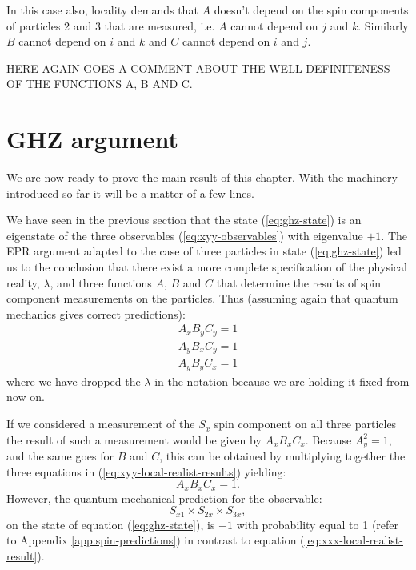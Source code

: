 In this case also, locality demands that $A$ doesn't depend on the spin components of particles 2 and 3 that are measured, i.e. $A$ cannot depend on $j$ and $k$. Similarly $B$ cannot depend on $i$ and $k$ and $C$ cannot depend on $i$ and $j$.

\begin{observation}
  HERE AGAIN GOES A COMMENT ABOUT THE WELL DEFINITENESS OF THE FUNCTIONS A, B AND C.
\end{observation}


\section{GHZ argument}
We are now ready to prove the main result of this chapter. With the machinery introduced so far it will be a matter of a few lines.

We have seen in the previous section that the state (\ref{eq:ghz-state}) is an eigenstate of the three observables (\ref{eq:xyy-observables}) with eigenvalue $+ 1$. The EPR argument adapted to the case of three particles in state (\ref{eq:ghz-state}) led us to the conclusion that there exist a more complete specification of the physical reality, $\lambda$, and three functions $A$, $B$ and $C$ that determine the results of spin component measurements on the particles. Thus (assuming again that quantum mechanics gives correct predictions):%
\begin{equation}
  \begin{split}
    A_x B_y C_y = 1\\
    A_y B_x C_y = 1\\
    A_y B_y C_x = 1
  \end{split}
  \label{eq:xyy-local-realist-results}
\end{equation}
where we have dropped the $\lambda$ in the notation because we are holding it fixed from now on.

If we considered a measurement of the $S_x$ spin component on all three particles the result of such a measurement would be given by $A_x B_x C_x$. Because $A_y^2 = 1$, and the same goes for $B$ and $C$, this can be obtained by multiplying together the three equations in (\ref{eq:xyy-local-realist-results}) yielding:
\begin{equation}
  A_x B_x C_x = 1.
  \label{eq:xxx-local-realist-result}
\end{equation}
However, the quantum mechanical prediction for the observable:
\begin{equation}
  S_{x1} \times S_{2x} \times S_{3x},
  \label{eq:xxx-observable}
\end{equation}
on the state of equation (\ref{eq:ghz-state}), is $- 1$ with probability equal to 1 (refer to Appendix \ref{app:spin-predictions}) in contrast to equation (\ref{eq:xxx-local-realist-result}).

